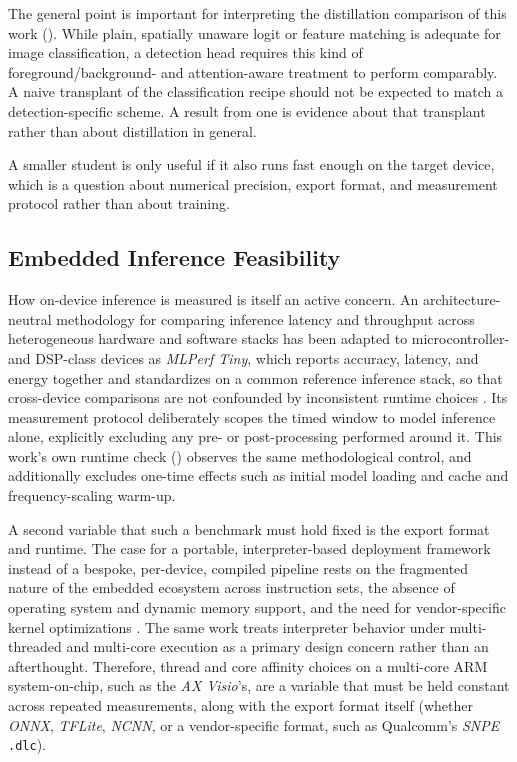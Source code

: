 The general point is important for interpreting the distillation comparison of this work (). While plain, spatially unaware logit or feature matching is adequate for image classification, a detection head requires this kind of foreground/background- and attention-aware treatment to perform comparably. A naive transplant of the classification recipe should not be expected to match a detection-specific scheme. A result from one is evidence about that transplant rather than about distillation in general.

A smaller student is only useful if it also runs fast enough on the target device, which is a question about numerical precision, export format, and measurement protocol rather than about training.

\subsection{Embedded Inference Feasibility}\label{sec:lit_embedded_inference}

How on-device inference is measured is itself an active concern. An architecture-neutral methodology for comparing inference latency and throughput across heterogeneous hardware and software stacks \cite{reddiMLPerfInferenceBenchmark2020} has been adapted to microcontroller- and DSP-class devices as \textit{MLPerf Tiny}, which reports accuracy, latency, and energy together and standardizes on a common reference inference stack, so that cross-device comparisons are not confounded by inconsistent runtime choices \cite{banburyMLPerfTinyBenchmark2021}. Its measurement protocol deliberately scopes the timed window to model inference alone, explicitly excluding any pre- or post-processing performed around it. This work's own runtime check () observes the same methodological control, and additionally excludes one-time effects such as initial model loading and cache and frequency-scaling warm-up.

A second variable that such a benchmark must hold fixed is the export format and runtime. The case for a portable, interpreter-based deployment framework instead of a bespoke, per-device, compiled pipeline rests on the fragmented nature of the embedded ecosystem across instruction sets, the absence of operating system and dynamic memory support, and the need for vendor-specific kernel optimizations \cite{davidTensorFlowLiteMicro2021}. The same work treats interpreter behavior under multi-threaded and multi-core execution as a primary design concern rather than an afterthought. Therefore, thread and core affinity choices on a multi-core ARM system-on-chip, such as the \textit{AX Visio}'s, are a variable that must be held constant across repeated measurements, along with the export format itself (whether \textit{ONNX}, \textit{TFLite}, \textit{NCNN}, or a vendor-specific format, such as Qualcomm's \textit{SNPE} \texttt{.dlc}).

